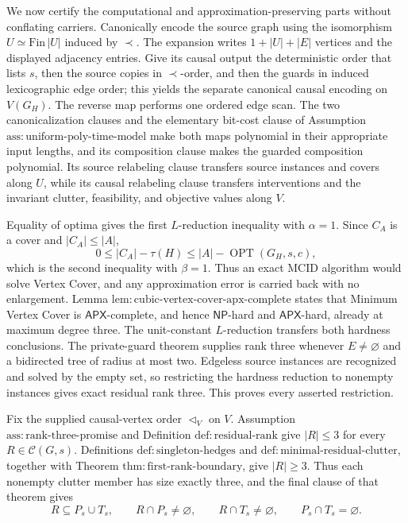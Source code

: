We now certify the computational and approximation-preserving parts without
conflating carriers.  Canonically encode the source graph using the
isomorphism \(U\simeq\mathrm{Fin}\,|U|\) induced by \(\prec\).  The
expansion writes \(1+|U|+|E|\) vertices and the displayed adjacency entries.
Give its causal output the deterministic order that lists \(s\), then the
source copies in \(\prec\)-order, and then the guards in induced
lexicographic edge order; this yields the separate canonical causal encoding
on \(V(G_H)\).  The reverse map performs one ordered edge scan.  The two
canonicalization clauses and the elementary bit-cost clause of Assumption
\(\mathrm{ass{:}uniform\mbox{-}poly\mbox{-}time\mbox{-}model}\) make both
maps polynomial in their appropriate input lengths, and its composition
clause makes the guarded composition polynomial.  Its source relabeling
clause transfers source instances and covers along \(U\), while its causal
relabeling clause transfers interventions and the invariant clutter,
feasibility, and objective values along \(V\).

Equality of optima gives the first \(L\)-reduction inequality with
\(\alpha=1\).  Since \(C_A\) is a cover and \(|C_A|\leq|A|\),
\[
 0\leq |C_A|-\tau(H)
 \leq |A|-\operatorname{OPT}(G_H,s,c),
\]
which is the second inequality with \(\beta=1\).  Thus an exact MCID
algorithm would solve Vertex Cover, and any approximation error is carried
back with no enlargement.  Lemma
\(\mathrm{lem{:}cubic\mbox{-}vertex\mbox{-}cover\mbox{-}apx\mbox{-}complete}\)
states that Minimum Vertex Cover is \(\mathsf{APX}\)-complete, and hence
\(\mathsf{NP}\)-hard and \(\mathsf{APX}\)-hard, already at maximum degree
three.  The unit-constant \(L\)-reduction transfers both hardness
conclusions.  The private-guard theorem supplies rank three whenever
\(E\neq\varnothing\) and a bidirected tree of radius at most two.  Edgeless
source instances are recognized and solved by the empty set, so restricting
the hardness reduction to nonempty instances gives exact residual rank
three.  This proves every asserted restriction.

Fix the supplied causal-vertex order \(\triangleleft_V\) on \(V\).
Assumption \(\mathrm{ass{:}rank\mbox{-}three\mbox{-}promise}\) and
Definition \(\mathrm{def{:}residual\mbox{-}rank}\) give \(|R|\leq3\) for
every \(R\in\mathcal C(G,s)\).  Definitions
\(\mathrm{def{:}singleton\mbox{-}hedges}\) and
\(\mathrm{def{:}minimal\mbox{-}residual\mbox{-}clutter}\), together with
Theorem \(\mathrm{thm{:}first\mbox{-}rank\mbox{-}boundary}\), give
\(|R|\geq3\).  Thus each nonempty clutter member has size exactly three,
and the final clause of that theorem gives
\[
 R\subseteq P_s\cup T_s,
 \qquad R\cap P_s\neq\varnothing,
 \qquad R\cap T_s\neq\varnothing,
 \qquad P_s\cap T_s=\varnothing.
\]

